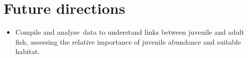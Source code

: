 \documentclass[version=last,
    paper=a4, %
    10pt, %
    usenames,
    dvipsnames,
    oneside, %
    headings=openany, %
    DIV=15 %
]{scrbook}
\begin{document}
\section*{Future directions}
\begin{itemize}
\itemsep1pt\parskip0pt
\item
  Compile and analyse~data to understand links between juvenile and
  adult fish, assessing the relative importance of juvenile abundance
  and suitable habitat.
\end{itemize}



\end{document}
